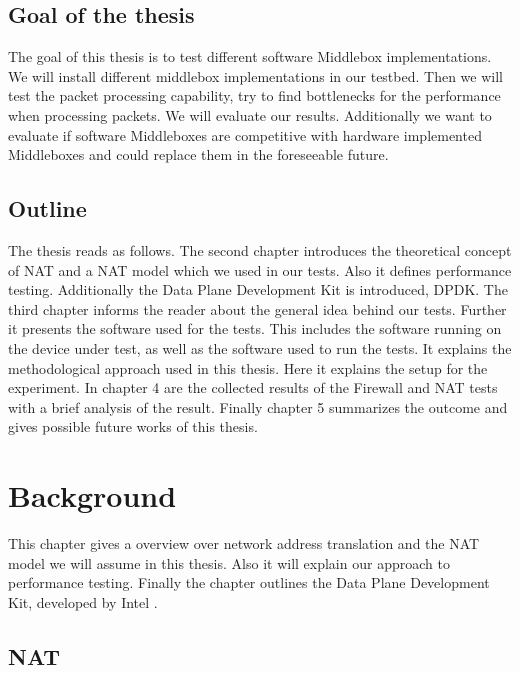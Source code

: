 \documentclass[11pt,a4paper,twoside,openright,bachelor,english]{netthesis}
\begin{document}
\section{Goal of the thesis}
The goal of this thesis is to test different software Middlebox implementations. We will install different middlebox implementations in our testbed. Then we will test the packet processing capability, try to find bottlenecks for the performance when processing packets. We will evaluate our results. 
Additionally we want to evaluate if software Middleboxes are competitive with hardware implemented Middleboxes and could replace them in the foreseeable future. 

\section{Outline}

The thesis reads as follows. The second chapter introduces the theoretical concept of NAT and a NAT model which we used in our tests. Also it defines performance testing. Additionally the Data Plane Development Kit is introduced, DPDK. The third chapter informs the reader about the general idea behind our tests. Further it presents the software used for the tests. This includes the software running on the device under test, as well as the software used to run the tests. It explains the methodological approach used in this thesis. Here it explains the setup for the experiment. In chapter 4 are the collected results of the Firewall and NAT tests with a brief analysis of the result. Finally chapter 5 summarizes the outcome and gives possible future works of this thesis. 

\chapter{Background}

This chapter gives a overview over network address translation and the NAT model we will assume in this thesis. Also it will explain our approach to performance testing. Finally the chapter outlines the Data Plane Development Kit, developed by Intel \cite{DPDKOv}.

\section{NAT}
\end{document}
